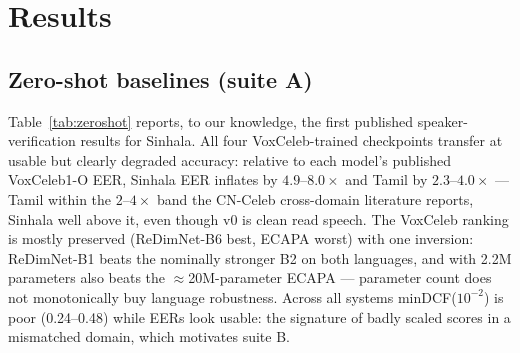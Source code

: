 
\chapter{Results}
\label{ch:results}

\section{Zero-shot baselines (suite A)}
\label{sec:zeroshot-results}

Table~\ref{tab:zeroshot} reports, to our knowledge, the first
published speaker-verification results for Sinhala. All four
VoxCeleb-trained checkpoints transfer at usable but clearly degraded
accuracy: relative to each model's published VoxCeleb1-O EER, Sinhala
EER inflates by $4.9$--$8.0\times$ and Tamil by $2.3$--$4.0\times$ —
Tamil within the $2$--$4\times$ band the CN-Celeb cross-domain
literature reports, Sinhala well above it, even though v0 is clean
read speech. The VoxCeleb ranking is mostly
preserved (ReDimNet-B6 best, ECAPA worst) with one inversion:
ReDimNet-B1 beats the nominally stronger B2 on both languages, and
with 2.2M parameters also beats the $\approx$20M-parameter ECAPA —
parameter count does not monotonically buy language robustness.
Across all systems minDCF($10^{-2}$) is poor (0.24--0.48) while EERs
look usable: the signature of badly scaled scores in a mismatched
domain, which motivates suite B.

